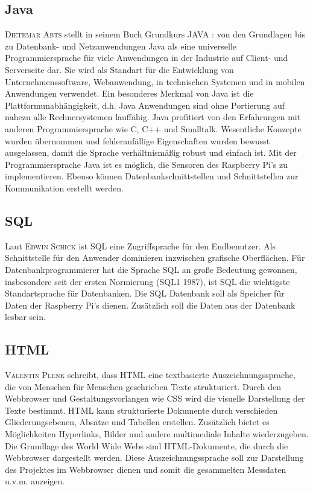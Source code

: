 \subsection{Java}

\textsc{Dietemar Abts} stellt in seinem Buch Grundkurs JAVA : von den Grundlagen bis zu Datenbank- und Netzanwendungen \cite{abts2015grundkurs} Java als eine universelle Programmiersprache für viele Anwendungen in der Industrie auf Client- und Serverseite dar.
Sie wird als Standart für die Entwicklung von Unternehmenssoftware, Webanwendung, in technischen Systemen und in mobilen Anwendungen verwendet.
Ein besonderes Merkmal von Java ist die Plattformunabhängigkeit, d.h. Java Anwendungen sind ohne Portierung auf nahezu alle Rechnersystemen 
lauffähig. Java profitiert von den Erfahrungen mit anderen Programmiersprache wie C, C++ und Smalltalk. Wesentliche Konzepte wurden übernommen und fehleranfällige Eigenschaften wurden bewusst ausgelassen, damit die Sprache verhältnismäßig robust und einfach ist. Mit der Programmiersprache Java ist es möglich, die Sensoren des Raspberry Pi's zu implementieren. Ebenso können Datenbankschnittstellen und Schnittstellen zur Kommunikation erstellt werden.

\subsection{\ac{SQL}}
Laut \textsc{Edwin Schick}\cite{schicker2017datenbanken} ist \ac{SQL} eine Zugriffsprache für den Endbenutzer. Als Schnittstelle für den Anwender dominieren inzwischen grafische Oberflächen. Für Datenbankprogrammierer hat die Sprache \ac{SQL} an große Bedeutung gewonnen, insbesondere seit der ersten Normierung (SQL1 1987), ist \ac{SQL} die wichtigste Standartsprache für Datenbanken. Die \ac{SQL} Datenbank soll als Speicher für Daten der Raspberry Pi's dienen. Zusätzlich soll die Daten aus der Datenbank lesbar sein.
\subsection{\ac{HTML}}
\textsc{Valentin Plenk}\cite{plenk2017angewandte} schreibt, dass \ac{HTML} eine textbasierte Auszeichnungssprache, die von Menschen für Menschen geschrieben Texte strukturiert. Durch den Webbrowser und Gestaltungsvorlangen wie \ac{CSS} wird die visuelle Darstellung der Texte bestimmt. \ac{HTML} kann strukturierte Dokumente durch verschieden Gliederungsebenen, Absätze und Tabellen erstellen. Zusätzlich bietet es Möglichkeiten Hyperlinks, Bilder und andere multimediale Inhalte wiederzugeben. Die Grundlage des World Wide Webs sind \ac{HTML}-Dokumente, die durch die Webbrowser dargestellt werden. Diese Auszeichnungssprache soll zur Darstellung des Projektes im Webbrowser dienen und somit die gesammelten Messdaten u.v.m. anzeigen.

